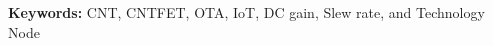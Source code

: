 
\vspace{1em}
\noindent\textbf{Keywords: } CNT, CNTFET, OTA, IoT, DC gain, Slew rate, and
Technology Node

